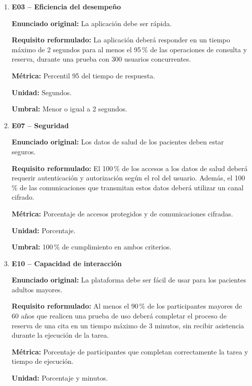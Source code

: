\documentclass[12pt,a4paper,oneside]{article}
\begin{document}
\begin{enumerate}[leftmargin=1.2cm]

    \item \textbf{E03 -- Eficiencia del desempeño}

    \textbf{Enunciado original:} La aplicación debe ser rápida.

    \textbf{Requisito reformulado:} La aplicación deberá responder
    en un tiempo máximo de 2 segundos para al menos el 95\,\%
    de las operaciones de consulta y reserva, durante una prueba
    con 300 usuarios concurrentes.

    \textbf{Métrica:} Percentil 95 del tiempo de respuesta.

    \textbf{Unidad:} Segundos.

    \textbf{Umbral:} Menor o igual a 2 segundos.

    \item \textbf{E07 -- Seguridad}

    \textbf{Enunciado original:} Los datos de salud de los
    pacientes deben estar seguros.

    \textbf{Requisito reformulado:} El 100\,\% de los accesos
    a los datos de salud deberá requerir autenticación y
    autorización según el rol del usuario. Además, el 100\,\%
    de las comunicaciones que transmitan estos datos deberá
    utilizar un canal cifrado.

    \textbf{Métrica:} Porcentaje de accesos protegidos y de
    comunicaciones cifradas.

    \textbf{Unidad:} Porcentaje.

    \textbf{Umbral:} 100\,\% de cumplimiento en ambos criterios.

    \item \textbf{E10 -- Capacidad de interacción}

    \textbf{Enunciado original:} La plataforma debe ser fácil
    de usar para los pacientes adultos mayores.

    \textbf{Requisito reformulado:} Al menos el 90\,\% de los
    participantes mayores de 60 años que realicen una prueba
    de uso deberá completar el proceso de reserva de una cita
    en un tiempo máximo de 3 minutos, sin recibir asistencia
    durante la ejecución de la tarea.

    \textbf{Métrica:} Porcentaje de participantes que completan
    correctamente la tarea y tiempo de ejecución.

    \textbf{Unidad:} Porcentaje y minutos.


\end{enumerate}
\end{document}
